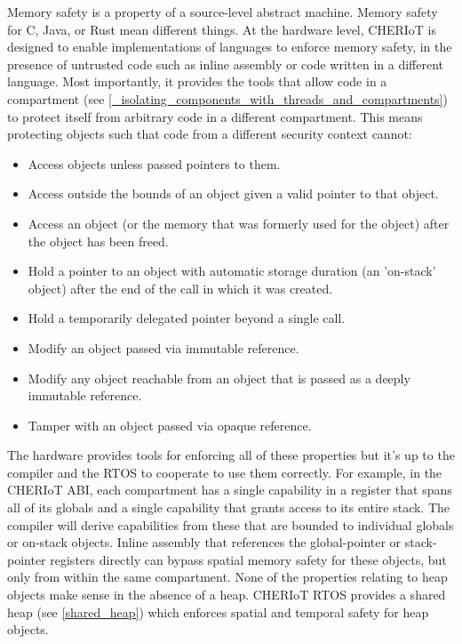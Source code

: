 Memory safety is a property of a source-level abstract machine.
Memory safety for C, Java, or Rust mean different things.
At the hardware level, CHERIoT is designed to enable implementations of languages to enforce memory safety, in the presence of untrusted code such as inline assembly or code written in a different language.
Most importantly, it provides the tools that allow code in a compartment (see \ref{_isolating_components_with_threads_and_compartments}) to protect itself from arbitrary code in a different compartment.
This means protecting objects such that code from a different security context cannot:

\begin{itemize}
	\item{Access objects unless passed pointers to them.}
	\item{Access outside the bounds of an object given a valid pointer to that object.}
	\item{Access an object (or the memory that was formerly used for the object) after the object has been freed.}
	\item{Hold a pointer to an object with automatic storage duration (an 'on-stack' object) after the end of the call in which it was created.}
	\item{Hold a temporarily delegated pointer beyond a single call.}
	\item{Modify an object passed via immutable reference.}
	\item{Modify any object reachable from an object that is passed as a deeply immutable reference.}
	\item{Tamper with an object passed via opaque reference.}
\end{itemize}

The hardware provides tools for enforcing all of these properties but it's up to the compiler and the RTOS to cooperate to use them correctly.
For example, in the CHERIoT ABI, each compartment has a single capability in a register that spans all of its globals and a single capability that grants access to its entire stack.
The compiler will derive capabilities from these that are bounded to individual globals or on-stack objects.
Inline assembly that references the global-pointer or stack-pointer registers directly can bypass spatial memory safety for these objects, but only from within the same compartment.
None of the properties relating to heap objects make sense in the absence of a heap.
CHERIoT RTOS provides a shared heap (see \ref{shared_heap}) which enforces spatial and temporal safety for heap objects.

